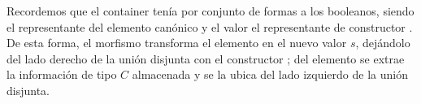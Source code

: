 Recordemos que el container  tenía por conjunto de formas a los booleanos, siendo  el representante del elemento canónico  y el valor  el representante de constructor .
De esta forma, el morfismo transforma el elemento  en el nuevo valor $s$, dejándolo del lado derecho de la unión disjunta con el constructor ; del elemento  se extrae la información de tipo $C$ almacenada y se la ubica del lado izquierdo de la unión disjunta. 
